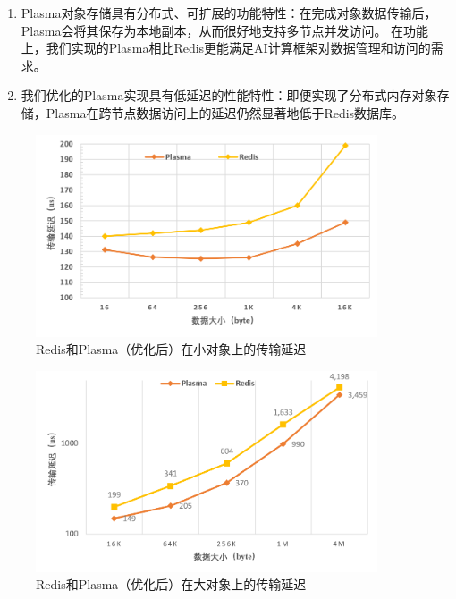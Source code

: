 \begin{enumerate}
    \item Plasma对象存储具有分布式、可扩展的功能特性：在完成对象数据传输后，Plasma会将其保存为本地副本，从而很好地支持多节点并发访问。
    在功能上，我们实现的Plasma相比Redis更能满足AI计算框架对数据管理和访问的需求。
    \item 我们优化的Plasma实现具有低延迟的性能特性：即便实现了分布式内存对象存储，Plasma在跨节点数据访问上的延迟仍然显著地低于Redis数据库。
\end{enumerate}

\begin{figure}[h]
	\centering
	\includegraphics[width=0.9\textwidth]{image/chap04/redis_small.png}
	\caption{Redis和Plasma（优化后）在小对象上的传输延迟}
	\label{fig:redis_small}
\end{figure}

\begin{figure}[h]
	\centering
	\includegraphics[width=0.9\textwidth]{image/chap04/redis_big.png}
	\caption{Redis和Plasma（优化后）在大对象上的传输延迟}
	\label{fig:redis_big}
\end{figure}